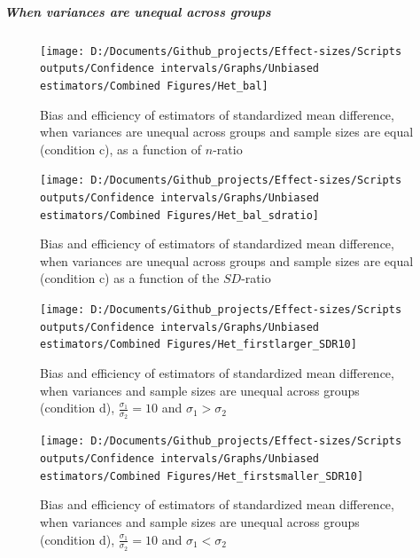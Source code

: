 \documentclass[
  man,floatsintext]{apa6}
\begin{document}
\hypertarget{when-variances-are-unequal-across-groups-1}{%
\subparagraph{When variances are unequal across groups}\label{when-variances-are-unequal-across-groups-1}}

\begin{figure}

{\centering \texttt{[image: D:/Documents/Github\_projects/Effect-sizes/Scripts outputs/Confidence intervals/Graphs/Unbiased estimators/Combined Figures/Het\_bal]} 

}

\caption{Bias and efficiency of estimators of standardized mean difference, when variances are unequal across groups and sample sizes are equal (condition c), as a function of $n$-ratio}\label{fig:idHetbal1bis}
\end{figure}

\begin{figure}

{\centering \texttt{[image: D:/Documents/Github\_projects/Effect-sizes/Scripts outputs/Confidence intervals/Graphs/Unbiased estimators/Combined Figures/Het\_bal\_sdratio]} 

}

\caption{Bias and efficiency of estimators of standardized mean difference, when variances are unequal across groups and sample sizes are equal (condition c) as a function of the $SD$-ratio}\label{fig:idHetbal2bis}
\end{figure}

\begin{figure}

{\centering \texttt{[image: D:/Documents/Github\_projects/Effect-sizes/Scripts outputs/Confidence intervals/Graphs/Unbiased estimators/Combined Figures/Het\_firstlarger\_SDR10]} 

}

\caption{Bias and efficiency of estimators of standardized mean difference, when variances and sample sizes are unequal across groups (condition d), $\frac{\sigma_1}{\sigma_2}=10$ and $\sigma_1>\sigma_2$}\label{fig:idHetunbal1bis}
\end{figure}

\begin{figure}

{\centering \texttt{[image: D:/Documents/Github\_projects/Effect-sizes/Scripts outputs/Confidence intervals/Graphs/Unbiased estimators/Combined Figures/Het\_firstsmaller\_SDR10]} 

}

\caption{Bias and efficiency of estimators of standardized mean difference, when variances and sample sizes are unequal across groups (condition d), $\frac{\sigma_1}{\sigma_2}=10$ and $\sigma_1<\sigma_2$}\label{fig:idHetunbal2bis}
\end{figure}
\end{document}
